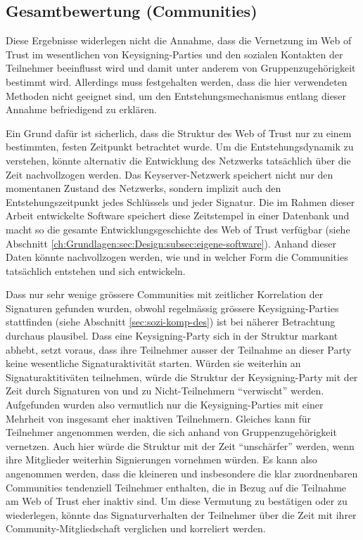 \subsection{Gesamtbewertung (Communities)}
\label{sec:gesamtb-comm}

Diese Ergebnisse widerlegen nicht die Annahme, dass die Vernetzung im
Web of Trust im wesentlichen von Keysigning-Parties und den sozialen
Kontakten der Teilnehmer beeinflusst wird und damit unter anderem von
Gruppenzugeh\"origkeit bestimmt wird. Allerdings muss festgehalten
werden, dass die hier verwendeten Methoden nicht geeignet sind, um den
Entstehungsmechanismus entlang dieser Annahme befriedigend zu
erkl\"aren. 

Ein Grund daf\"ur ist sicherlich, dass die Struktur des Web of Trust
nur zu einem bestimmten, festen Zeitpunkt betrachtet wurde. Um die
Entstehungsdynamik zu verstehen, k\"onnte alternativ die Entwicklung
des Netzwerks tats\"achlich \"uber die Zeit nachvollzogen werden. Das
Keyserver-Netzwerk speichert nicht nur den momentanen Zustand des
Netzwerks, sondern implizit auch den Entstehungszeitpunkt jedes
Schl\"ussels und jeder Signatur. Die im Rahmen dieser Arbeit
entwickelte Software speichert diese Zeitstempel in einer Datenbank
und macht so die gesamte Entwicklungsgeschichte des Web of Trust
verf\"ugbar (siehe Abschnitt
\ref{ch:Grundlagen:sec:Design:subsec:eigene-software}). Anhand dieser
Daten k\"onnte nachvollzogen werden, wie und in welcher Form die
Communities tats\"achlich entstehen und sich entwickeln.

Dass nur sehr wenige gr\"ossere Communities mit zeitlicher Korrelation
der Signaturen gefunden wurden, obwohl regelm\"assig gr\"ossere
Keysigning-Parties stattfinden (siehe Abschnitt
\ref{sec:sozi-komp-des}) ist bei n\"aherer Betrachtung durchaus
plausibel. Dass eine Keysigning-Party sich in der Struktur markant
abhebt, setzt voraus, dass ihre Teilnehmer ausser der Teilnahme an
dieser Party keine wesentliche Signaturaktivit\"at starten. W\"urden
sie weiterhin an Signaturaktitiv\"aten teilnehmen, w\"urde die
Struktur der Keysigning-Party mit der Zeit durch Signaturen von und zu
Nicht-Teilnehmern ``verwischt'' werden. Aufgefunden wurden also
vermutlich nur die Keysigning-Parties mit einer Mehrheit von insgesamt
eher inaktiven Teilnehmern. Gleiches kann f\"ur Teilnehmer angenommen
werden, die sich anhand von Gruppenzugeh\"origkeit vernetzen. Auch
hier w\"urde die Struktur mit der Zeit ``unsch\"arfer'' werden, wenn
ihre Mitglieder weiterhin Signierungen vornehmen w\"urden. Es kann
also angenommen werden, dass die kleineren und insbesondere die klar
zuordnenbaren Communities tendenziell Teilnehmer enthalten, die in
Bezug auf die Teilnahme am Web of Trust eher inaktiv sind. Um diese
Vermutung zu best\"atigen oder zu wiederlegen, k\"onnte das
Signaturverhalten der Teilnehmer \"uber die Zeit mit ihrer
Community-Mitgliedschaft verglichen und korreliert werden.

